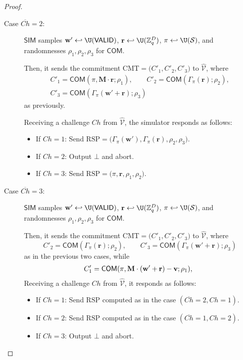 \begin{proof}
\begin{description}
      \smallskip

    \item[\textsf{Case} $\overline{Ch}=2$:] $\mathsf{SIM}$ samples $\mathbf{w}' \hookleftarrow \U(\mathsf{VALID})$, $\mathbf{r} \hookleftarrow \U(\mathbb{Z}_q^D)$, $\pi \hookleftarrow  \U(\mathcal{S})$, and randomnesses $\rho_1, \rho_2, \rho_3$ for $\mathsf{COM}$.

      Then, it sends the commitment $\mathrm{CMT}= \big(C'_1, C'_2, C'_3\big)$ to $\widehat{\mathcal{V}}$, where
      \begin{gather*}
        C'_1 =  \mathsf{COM}(\pi, \mathbf{M}\cdot \mathbf{r}; \rho_1), \qquad
        C'_2 =  \mathsf{COM}(\Gamma_{\pi}(\mathbf{r}); \rho_2), \\
        C'_3 =  \mathsf{COM}(\Gamma_{\pi}(\mathbf{w}' + \mathbf{r}); \rho_3)
      \end{gather*}
      as previously.

      Receiving a challenge $Ch$ from $\widehat{\mathcal{V}}$, the simulator responds as follows:
      \begin{itemize}
        \item If $Ch=1$: Send $\mathrm{RSP} = \big(\Gamma_\pi(\mathbf{w}'), \Gamma_\pi(\mathbf{r}), \rho_2, \rho_3\big)$.
        \item If $Ch=2$: Output $\bot$ and abort.
        \item If $Ch=3$: Send $\mathrm{RSP} = \big(\pi, \mathbf{r}, \rho_1, \rho_2\big)$.
      \end{itemize}

      \smallskip

    \item[Case $\overline{Ch}=3$:] $\mathsf{SIM}$ samples $\mathbf{w}' \hookleftarrow \U(\mathsf{VALID})$, $\mathbf{r} \hookleftarrow \U(\mathbb{Z}_q^D)$, $\pi \hookleftarrow  \U(\mathcal{S})$, and randomnesses $\rho_1, \rho_2, \rho_3$ for $\mathsf{COM}$.

      Then, it sends the commitment $\mathrm{CMT}= \big(C'_1, C'_2, C'_3\big)$ to $\widehat{\mathcal{V}}$, where
      \[ C'_2 =  \mathsf{COM}(\Gamma_{\pi}(\mathbf{r}); \rho_2), \qquad C'_3 =  \mathsf{COM}(\Gamma_{\pi}(\mathbf{w}' + \mathbf{r}); \rho_3)\]
      as in the previous two cases, while
      \begin{eqnarray*}
        C'_1 =  \mathsf{COM}(\pi, \mathbf{M}\cdot (\mathbf{w}'+ \mathbf{r}) - \mathbf{v}; \rho_1), \hspace*{5pt}
      \end{eqnarray*}
      Receiving a challenge $Ch$ from $\widehat{\mathcal{V}}$, it responds as follows:
      \begin{itemize}
        \item If $Ch=1$: Send $\mathrm{RSP}$ computed as in the case $(\overline{Ch}=2, Ch=1)$.
        \item If $Ch=2$: Send $\mathrm{RSP}$ computed as in the case $(\overline{Ch}=1, Ch=2)$.
        \item If $Ch=3$: Output $\bot$ and abort.
      \end{itemize}
  \end{description}
  \smallskip


\end{proof}
